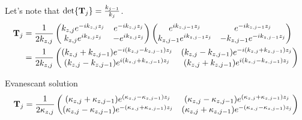 Let's note that $\det{\vb{T}_j} = \frac{k_{j-1}}{k_{j}}$.
\begin{align*}
	\vb{T}_j                                                      & =
	\frac{1}{2k_{z,j}}\pmqty{
	k_{z,j} e^{-ik_{z,j}z_j}                                      &
	e^{-ik_{z,j}z_j}                                                                            \\
	k_{z,j} e^{ik_{z,j}z_j}                                       &
	-e^{ik_{z,j}z_j}
	} \pmqty{
	e^{ik_{z,j-1}z_j}                                             &
	e^{-ik_{z,j-1}z_j}                                                                          \\
	k_{z,j-1} e^{ik_{z,j-1}z_j}                                   &
	-k_{z,j-1} e^{-ik_{z,j-1}z_j}
	}                                                                                           \\
	                                                              & = \frac{1}{2k_{z,j}}\pmqty{
	\pqty{k_{z,j} + k_{z,j-1}}e^{-i\pqty{k_{z,j} - k_{z,j-1}}z_j} &
	\pqty{k_{z,j} - k_{z,j-1}}e^{-i\pqty{k_{z,j} + k_{z,j-1}}z_j}                               \\
	\pqty{k_{z,j} - k_{z,j-1}}e^{ i\pqty{k_{z,j} + k_{z,j-1}}z_j} &
	\pqty{k_{z,j} + k_{z,j-1}}e^{ i\pqty{k_{z,j} - k_{z,j-1}}z_j}
	}                                                                                           \\
\end{align*}

Evanescant solution
\begin{align*}
	\vb{T}_j                                                                          & =
	\frac{1}{2\kappa_{z,j}}\pmqty{
	\pqty{\kappa_{z,j} + \kappa_{z,j-1}}e^{\pqty{\kappa_{z,j} - \kappa_{z,j-1}}z_j}   &
	\pqty{\kappa_{z,j} - \kappa_{z,j-1}}e^{\pqty{\kappa_{z,j} + \kappa_{z,j-1}}z_j}       \\
	\pqty{\kappa_{z,j} - \kappa_{z,j-1}}e^{ -\pqty{\kappa_{z,j} + \kappa_{z,j-1}}z_j} &
	\pqty{\kappa_{z,j} + \kappa_{z,j-1}}e^{ -\pqty{\kappa_{z,j} - \kappa_{z,j-1}}z_j}
	}                                                                                     \\
\end{align*}


